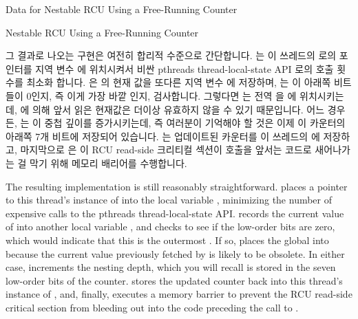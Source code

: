 \fi

\begin{listing}[tbp]

\caption{Data for Nestable RCU Using a Free-Running Counter}
\label{lst:app:toyrcu:Data for Nestable RCU Using a Free-Running Counter}
\end{listing}

\begin{listing}[tbp]
\vspace*{-11pt}
\caption{Nestable RCU Using a Free-Running Counter}
\label{lst:app:toyrcu:Nestable RCU Using a Free-Running Counter}
\end{listing}

\begin{fcvref}
그 결과로 나오는  구현은 여전히 합리적 수준으로 간단합니다.
 는 이 쓰레드의  로의 포인터를 지역 변수
 에 위치시켜서 비싼 pthreads thread-local-state API 로의 호출 횟수를
최소화 합니다.
 은  의 현재 값을 또다른 지역 변수  에
저장하며,  는 이 아래쪽 비트들이 0인지, 즉 이게 가장 바깥
 인지, 검사합니다.
그렇다면  는 전역  을  에 위치시키는데,
 에 의해 앞서 읽은 현재값은 더이상 유효하지 않을 수 있기
때문입니다.
어느 경우든,  는 이 중첩 깊이를 증가시키는데, 즉 여러분이
기억해야 할 것은 이제 이 카운터의 아래쪽 7개 비트에 저장되어 있습니다.
 는 업데이트된 카운터를 이 쓰레드의  에
저장하고, 마지막으로  은 이 RCU read-side 크리티컬 섹션이
 호출을 앞서는 코드로 새어나가는 걸 막기 위해 메모리
배리어를 수행합니다.
\end{fcvref}

\iffalse

\begin{fcvref}
The resulting  implementation is still reasonably
straightforward.
 places a pointer to
this thread's instance of 
into the local variable , minimizing the number of expensive
calls to the pthreads thread-local-state API\@.
 records the current value of 
into another local variable , and  checks
to see if the low-order bits are zero, which would indicate that
this is the outermost .
If so,  places the global 
into  because the current value previously fetched by
 is likely to be obsolete.
In either case,  increments the nesting depth,
which you will recall is stored in the seven low-order bits of the counter.
 stores the updated counter back into this thread's
instance of , and,
finally,  executes a memory barrier
to prevent the RCU read-side critical section from bleeding out
into the code preceding the call to .
\end{fcvref}

